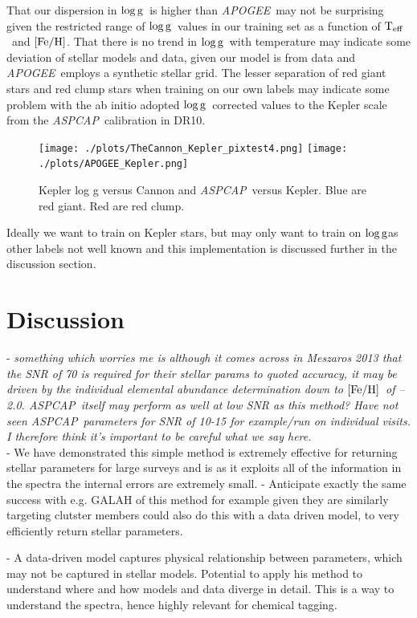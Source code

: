 \documentclass[12pt, preprint]{aastex}
\newcommand{\teff}{\mbox{$\rm T_{eff}$}}
\newcommand{\feh}{\mbox{$\rm [Fe/H]$}}
\newcommand{\logg}{\mbox{$\rm \log g$}}
\newcommand{\apogee}{\textsl{APOGEE}}
\newcommand{\aspcap}{\textsl{ASPCAP}}
\begin{document}
That our dispersion in \logg\ is higher than \apogee\ may not be surprising given the restricted range of \logg\ values in our training set as a function of \teff\ and \feh. That there is no trend in \logg\ with temperature may indicate some deviation of stellar models and data, given our model is from data and \apogee\ employs a synthetic stellar grid. The lesser separation of red giant stars and red clump stars when training on our own labels may indicate some problem with the ab initio adopted \logg\ corrected values to the Kepler scale from the \aspcap\ calibration in DR10.

  \begin{figure}[h!]
 \texttt{[image: ./plots/TheCannon\_Kepler\_pixtest4.png]}
  \texttt{[image: ./plots/APOGEE\_Kepler.png]}
 \caption{Kepler log g versus Cannon and \aspcap\ versus Kepler. Blue are red giant. Red are red clump.}
\label{fig:kepler}
\end{figure}


Ideally we want to train on Kepler stars, but may only want to train on \logg as other labels not well known and this implementation is discussed further in the discussion section. 


\section{Discussion}

- \textit{something which worries me is although it comes across in Meszaros 2013 that the SNR of 70 is required for their stellar params to quoted accuracy, it may be driven by the individual elemental abundance determination down to \feh\ of --2.0. \aspcap\ itself may perform as well at low SNR as this method? Have not seen \aspcap\ parameters for SNR of 10-15 for example/run on individual visits. I therefore think it's important to be careful what we say here.} \\

- We have demonstrated this simple method is extremely effective for returning stellar parameters for large surveys and is as it exploits all of the information in the spectra the internal errors are extremely small. - Anticipate exactly the same success with e.g. GALAH of this method for example given they are similarly targeting clutster members could also do this with a data driven model, to very efficiently return stellar parameters. 

- A data-driven model captures physical relationship between parameters, which may not be captured in stellar models. Potential to apply his method to understand where and how models and data diverge in detail. This is a way to understand the spectra, hence highly relevant for chemical tagging. 
\end{document}
